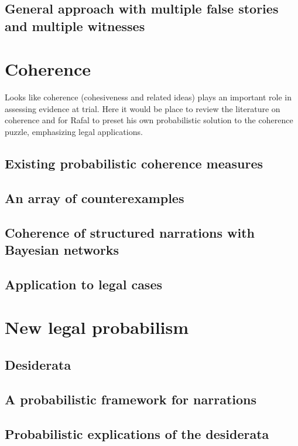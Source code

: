 \documentclass[]{book}
\begin{document}
\section{General approach  with multiple false stories and multiple witnesses}

\chapter{Coherence}

Looks like coherence (cohesiveness and related ideas)
plays an important role in assessing evidence at trial.
Here it would be place to review the literature on coherence
and for Rafal to preset his
own probabilistic solution to the coherence puzzle,
emphasizing legal applications.

\section{Existing probabilistic coherence measures}

\section{An array of counterexamples}

\section{Coherence of structured narrations 
with Bayesian networks}

\section{Application to legal cases}

\chapter{New legal probabilism}

\section{Desiderata}

\section{A probabilistic framework for narrations}

\section{Probabilistic explications of the desiderata}
\end{document}
